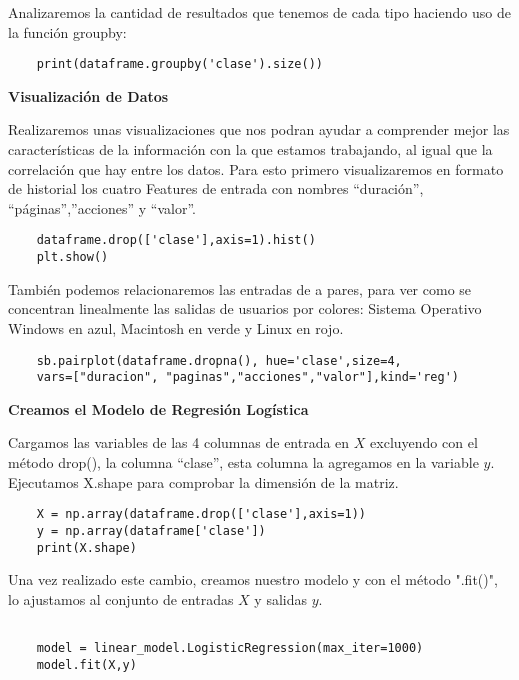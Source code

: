 \documentclass{pssbmac}
\begin{document}
\vspace{.3cm}

Analizaremos la cantidad de resultados que tenemos de cada tipo haciendo uso de la función groupby:
\begin{lstlisting}
    print(dataframe.groupby('clase').size())
\end{lstlisting}

\vspace{.3cm}


\textbf{Visualización de Datos}




Realizaremos unas visualizaciones que nos podran ayudar a comprender mejor las características de la información con la que estamos trabajando, al igual que la correlación que hay entre los datos.
Para esto primero visualizaremos en formato de historial los cuatro Features de entrada con nombres “duración”, “páginas”,”acciones” y “valor”.
\begin{lstlisting}
    dataframe.drop(['clase'],axis=1).hist()
    plt.show()
\end{lstlisting}

También podemos relacionaremos  las entradas de a pares, para ver como se concentran linealmente las salidas de usuarios por colores: Sistema Operativo Windows en azul, Macintosh en verde y Linux en rojo.
\begin{lstlisting}
    sb.pairplot(dataframe.dropna(), hue='clase',size=4,
    vars=["duracion", "paginas","acciones","valor"],kind='reg')
\end{lstlisting}

\vspace{.3cm}


\textbf{Creamos el Modelo de Regresión Logística}



Cargamos las variables de las 4 columnas de entrada en \(X\) excluyendo con el método drop(), la columna ``clase'', esta columna la agregamos en la variable \(y\). Ejecutamos X.shape para comprobar la dimensión de la matriz.
\begin{lstlisting} 
    X = np.array(dataframe.drop(['clase'],axis=1))
    y = np.array(dataframe['clase'])
    print(X.shape)
\end{lstlisting}



Una vez realizado este cambio, creamos nuestro modelo y con el método ".fit()", lo ajustamos al conjunto de entradas \(X\) y salidas \(y\).
\begin{lstlisting}
    
    model = linear_model.LogisticRegression(max_iter=1000)
    model.fit(X,y)
\end{lstlisting}
\end{document}
